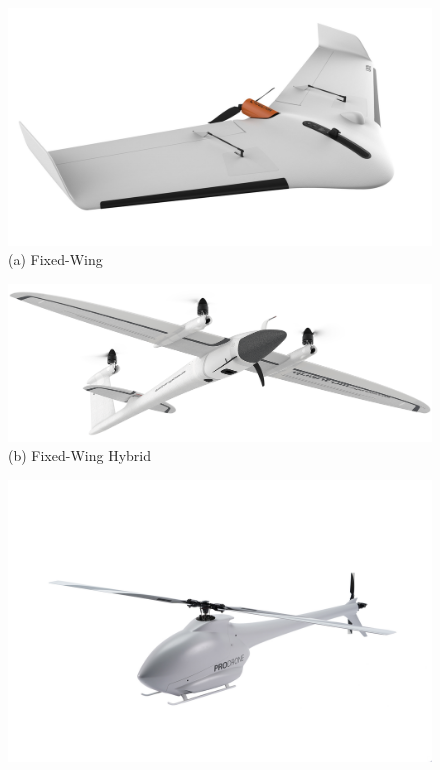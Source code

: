 \begin{figure} [H]
    \centering
    \begin{minipage}{.5\textwidth}
      \centering
      \includegraphics[width=\linewidth]{Images/Introduction/uav-fixed-wing-example.jpg}
      {(a) Fixed-Wing} 
    \end{minipage}%
    \begin{minipage}{.5\textwidth}
      \centering
      \includegraphics[width=\linewidth]{Images/Introduction/uav-fixed-wing-hybrid-example.png}
      {(b) Fixed-Wing Hybrid} 
    \end{minipage}
    \begin{minipage}{.5\textwidth}
        \centering
        \includegraphics[width=\linewidth]{Images/Introduction/uav-single-rotor-example.jpg}

\end{minipage}
\end{figure}
